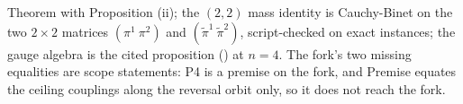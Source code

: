 Theorem  with Proposition (ii); the $(2,2)$ mass identity is Cauchy-Binet on the two $2 \times 2$ matrices $(\pi^{1}\ \pi^{2})$ and $(\tilde\pi^{1}\ \tilde\pi^{2})$, script-checked on exact instances; the gauge algebra is the cited proposition () at $n = 4$. The fork's two missing equalities are scope statements: P4 is a premise on the fork, and Premise  equates the ceiling couplings along the reversal orbit only, so it does not reach the fork.
